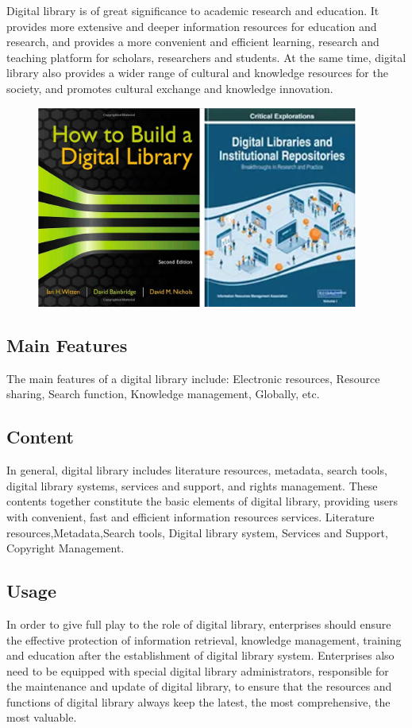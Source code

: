 Digital library is of great significance to academic research and education. It provides more extensive and deeper information resources for education and research, and provides a more convenient and efficient learning, research and teaching platform for scholars, researchers and students. At the same time, digital library also provides a wider range of cultural and knowledge resources for the society, and promotes cultural exchange and knowledge innovation.

\begin{figure}[htbp]
  \centerline{\includegraphics[width=300pt]{images/M1-2-2.png}}
\end{figure}

\subsection{Main Features}
The main features of a digital library include:
Electronic resources, Resource sharing, Search function, Knowledge management, Globally, etc.

\subsection{Content}
In general, digital library includes literature resources, metadata, search tools, digital library systems, services and support, and rights management. These contents together constitute the basic elements of digital library, providing users with convenient, fast and efficient information resources services.
Literature resources,Metadata,Search tools, Digital library system, Services and Support, Copyright Management.

\subsection{Usage}
In order to give full play to the role of digital library, enterprises should ensure the effective protection of information retrieval, knowledge management, training and education after the establishment of digital library system. Enterprises also need to be equipped with special digital library administrators, responsible for the maintenance and update of digital library, to ensure that the resources and functions of digital library always keep the latest, the most comprehensive, the most valuable.

